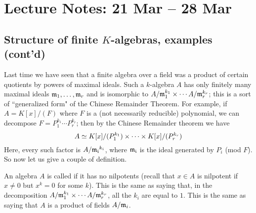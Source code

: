 \section{Lecture Notes: 21 Mar -- 28 Mar}

\subsection{Structure of finite $K$-algebras, examples (cont'd)}
Last time we have seen that a finite algebra over a field was a product of certain quotients by powers of maximal ideals. 
Such a $k$-algebra $A$ has only finitely many maximal ideals $\mathfrak{m}_1, \dotsc, \mathfrak{m}_r$ and is isomorphic to $A / \mathfrak{m}_1^{k_1} \times \dotsb A / \mathfrak{m}_r^{k_r}$; this is a sort of ``generalized form" of the Chinese Remainder Theorem.
For example, if $A = K[x] / (F)$ where $F$ is a (not necessarily reducible) polynomial, we can decompose $F = P_1^{k_1} \dotsb P_r^{k_r}$; then by the Chinese Remainder theorem we have \[ A \simeq K[x] / (P_1^{k_1}) \times \dotsb \times K[x] / (P_r^{k_r})\] 
Here, every such factor is $A / \mathfrak{m_i}^{k_i}$, where $\mathfrak{m_i}$ is the ideal generated by $P_i$ (mod $F$).
So now let us give a couple of definition.
\begin{dfn} 
An algebra $A$ is called  if it has no nilpotents (recall that $x \in A$ is nilpotent if $x \neq 0$ but $x^k = 0$ for some $k$).
This is the same as saying that, in the decomposition $A / \mathfrak{m}_1^{k_1} \times \dotsb A / \mathfrak{m}_r^{k_r}$, all the $k_i$ are equal to $1$.
This is the same as saying that $A$ is a product of fields $A / \mathfrak{m}_i$.
\end{dfn}

